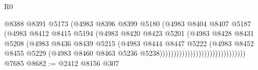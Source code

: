 \begin{lexlean}{R0}
\begin{coremodule}
                                                @8388
                                                @8391
                                                @5173
                                                (@4983
                                                  @8396
                                                  @8399
                                                  @5180
                                                  (@4983
                                                    @8404
                                                    @8407
                                                    @5187
                                                    (@4983
                                                      @8412
                                                      @8415
                                                      @5194
                                                      (@4983
                                                        @8420
                                                        @8423
                                                        @5201
                                                        (@4983
                                                          @8428
                                                          @8431
                                                          @5208
                                                          (@4983
                                                            @8436
                                                            @8439
                                                            @5215
                                                            (@4983
                                                              @8444
                                                              @8447
                                                              @5222
                                                              (@4983
                                                                @8452
                                                                @8455
                                                                @5229
                                                                (@4983
                                                                  @8460
                                                                  @8463
                                                                  @5236
                                                                  @5238)))))))))))))))))))))))))))))))
    @7685
@8682 := @2412
    @8156
    @307

\end{coremodule}
\end{lexlean}
